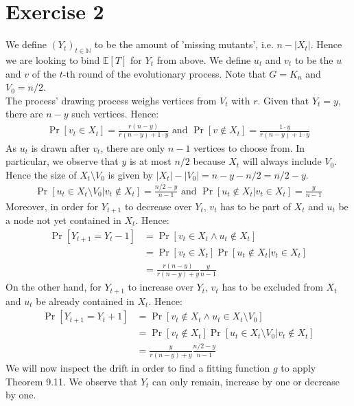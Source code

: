 \documentclass[a4paper,german]{article}
\newcommand{\E}{\mathbb{E}}
\begin{document}
\section*{Exercise 2}
We define \((Y_t)_{t \in \mathbb{N}}\) to be the amount of 'missing mutants', i.e. \(n - |X_t|\). Hence we are looking to bind \(\E[T]\) for \(Y_t\) from above. We define \(u_t\) and \(v_t\) to be the \(u\) and \(v\) of the \(t\)-th round of the evolutionary process. Note that \(G = K_n\) and \(V_0 = n/2\). \\
The process' drawing process weighs vertices from \(V_t\) with \(r\). Given that \(Y_t = y\), there are \(n - y\) such vertices. Hence:
\begin{align*}
	\Pr[v_t \in X_t] = \frac{r(n-y)}{r(n-y) + 1 \cdot y} \text{ and } \Pr[v \notin X_t] = \frac{1 \cdot y}{r(n-y) + 1 \cdot y} 
\end{align*}
As \(u_t\) is drawn after \(v_t\), there are only \(n-1\) vertices to choose from. In particular, we observe that \(y\) is at most \(n/2\) because \(X_t\) will always include \(V_0\). Hence the size of \(X_t \setminus V_0\) is given by \(|X_t| - |V_0| = n - y - n/2 = n/2 - y\).
\begin{align*}
	\Pr[u_t \in X_t \setminus V_0 | v_t \notin X_t] = \frac{n/2 - y}{n-1} \text{ and } \Pr[u_t \notin X_t | v_t \in X_t ] = \frac{y}{n-1}
\end{align*}
Moreover, in order for \(Y_{t+1}\) to decrease over \(Y_t\), \(v_t\) has to be part of \(X_t\) and \(u_t\) be a node not yet contained in \(X_t\). Hence:
\begin{align*}
	\Pr[Y_{t+1} = Y_t - 1] &= \Pr[v_t \in X_t \wedge u_t \notin X_t] \\
	&= \Pr[v_t \in X_t] \Pr[u_t \notin X_t | v_t \in X_t] \\
	&= \frac{r(n-y)}{r(n-y) + y} \frac{y}{n-1}
\end{align*}
On the other hand, for \(Y_{t+1}\) to increase over \(Y_t\),  \(v_t\) has to be excluded from \(X_t\) and \(u_t\) be already contained in \(X_t\). Hence:
\begin{align*}
	\Pr[Y_{t+1} = Y_t + 1] &= \Pr[v_t \notin X_t \wedge u_t \in X_t \setminus V_0] \\
	&= \Pr[v_t \notin X_t] \Pr[u_t \in X_t \setminus V_0 | v_t \notin X_t] \\
	&= \frac{y}{r(n-y) + y} \frac{n/2 - y}{n-1}
\end{align*}
We will now inspect the drift in order to find a fitting function \(g\) to apply Theorem 9.11. We observe that \(Y_t\) can only remain, increase by one or decrease by one.
\end{document}
